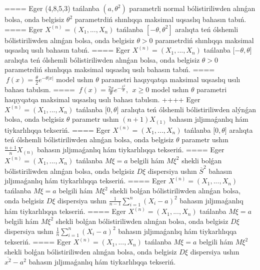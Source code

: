 ====
Eger (4,8,5,3) tańlanba \(\left( a,\theta^{2} \right)\) parametrli normal bólistiriliwden alınǵan bolsa, onda belgisiz \(\theta^{2}\) parametrdiń shınlıqqa maksimal uqsaslıq bahasın tabıń.
====
Eger \(X^{(n)} = \left( X_{1},...,X_{n} \right)\) tańlanba \(\left\lbrack - \theta,\theta^{2} \right\rbrack\) aralıqta teń ólshemli bólistiriliwden alınǵan bolsa, onda belgisiz \(\theta > 0\) parametrdiń shınlıqqa maksimal uqsaslıq usılı bahasın tabıń.
====
Eger \(X^{(n)} = \left( X_{1},...,X_{n} \right)\) tańlanba \(\lbrack - \theta,\theta\rbrack\) aralıqta teń ólshemli bólistiriliwden alınǵan bolsa, onda belgisiz \(\theta > 0\) parametrdiń shınlıqqa maksimal uqsaslıq usılı bahasın tabıń.
====
\(\ f(x) = \frac{\theta}{2}e^{- \theta|x|}\) model ushın \(\theta\) parametri haqıyqatqa maksimal uqsaslıq usılı bahası tabılsın.
====
\(\ f(x) = \frac{2x}{\theta}e^{- \frac{x^{2}}{\theta}},\ \ x \geq 0\) model ushın \(\theta\) parametri haqıyqatqa maksimal uqsaslıq usılı bahası tabılsın.
++++
Eger \(X^{(n)} = \left( X_{1},...,X_{n} \right)\) tańlanba \(\lbrack 0,\theta\rbrack\) aralıqta teń ólshemli bólistiriliwden alýnǵan bolsa, onda belgisiz \(\theta\) parametr ushın \((n + 1)X_{(1)}\) bahasın jıljımaǵanlıq hám tiykarlılıqqa tekseriń.
====
Eger \(X^{(n)} = \left( X_{1},...,X_{n} \right)\) tańlanba \(\lbrack 0,\theta\rbrack\) aralıqta teń ólshemli bólistiriliwden alınǵan bolsa, onda belgisiz \(\theta\) parametr ushın \(\frac{n + 1}{n}X_{(n)}\) bahasın jıljımaǵanlıq hám tiykarlılıqqa tekseriń.
====
Eger \(X^{(n)} = \left( X_{1},...,X_{n} \right)\) tańlanba \(M\xi = a\) belgili hám \(M\xi^{2}\) shekli bolǵan bólistiriliwden alınǵan bolsa, onda belgisiz \(D\xi\) dispersiya ushın \({\overline{S}}^{2}\) bahasın jıljımaǵanlıq hám tiykarlılıqqa tekseriń.
====
Eger \(X^{(n)} = \left( X_{1},...,X_{n} \right)\) tańlanba \(M\xi = a\) belgili hám \(M\xi^{2}\) shekli bolǵan bólistiriliwden alınǵan bolsa, onda belgisiz \(D\xi\) dispersiya ushın \(\frac{1}{n - 1}\sum_{i = 1}^{n}\left( X_{i} - a \right)^{2}\) bahasın jıljımaǵanlıq hám tiykarlılıqqa tekseriń.
====
Eger \(X^{(n)} = \left( X_{1},...,X_{n} \right)\) tańlanba \(M\xi = a\) belgili hám \(M\xi^{2}\) shekli bolǵan bólistiriliwden alınǵan bolsa, onda belgisiz \(D\xi\) dispersiya ushın \(\frac{1}{n}\sum_{i = 1}^{n}\left( X_{i} - a \right)^{2}\) bahasın jıljımaǵanlıq hám tiykarlılıqqa tekseriń.
====
Eger \(X^{(n)} = \left( X_{1},...,X_{n} \right)\) tańlanba \(M\xi = a\) belgili hám \(M\xi^{2}\) shekli bolǵan bólistiriliwden alınǵan bolsa, onda belgisiz \(D\xi\) dispersiya ushın \(\overline{x^{2}} - a^{2}\) bahasın jıljımaǵanlıq hám tiykarlılıqqa tekseriń.
